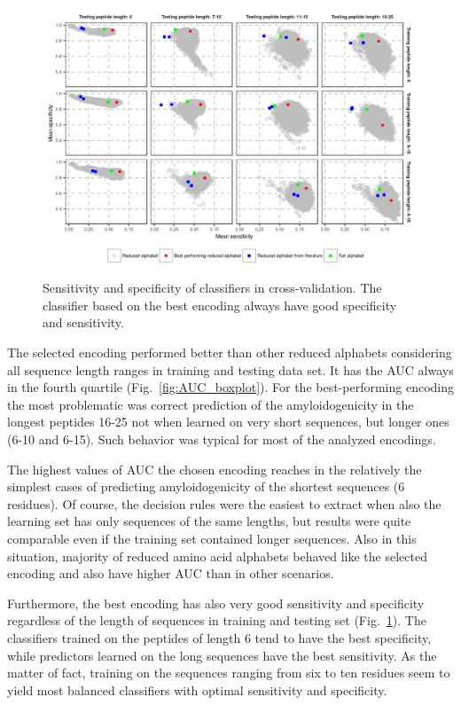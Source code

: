 \documentclass{bioinfo}
\begin{document}
\begin{figure}[!tpb]
\centerline{\includegraphics{figures/sesp_plot.png}}
\caption{Sensitivity and specificity of classifiers in cross-validation. 
The classifier based on the best encoding always have 
good specificity and sensitivity.}\label{fig:sesp_plot}
\end{figure}

  The selected encoding performed better than other reduced alphabets 
considering all sequence length ranges in training and testing data set. It has 
the AUC always in the fourth quartile (Fig.~\ref{fig:AUC_boxplot}). For the 
best-performing encoding the most problematic was correct prediction of the 
amyloidogenicity in the longest peptides 16-25 not when learned on very short 
sequences, but longer ones (6-10 and 6-15). Such behavior was typical for most 
of the analyzed encodings.

  The highest values of AUC the chosen encoding reaches in the relatively the 
simplest cases of predicting amyloidogenicity of the shortest sequences (6 
residues). Of course, the decision rules were the easiest to extract when also 
the learning set has only sequences of the same lengths, but results were quite 
comparable even if the training set contained longer sequences. Also in this 
situation, majority of reduced amino acid alphabets behaved like the selected 
encoding and also have higher AUC than in other scenarios.

  Furthermore, the best encoding has also very good sensitivity and specificity 
regardless of the length of sequences in training and testing 
set (Fig.~\ref{fig:sesp_plot}). The classifiers trained on the peptides of 
length 6 tend to have the best specificity, while predictors learned on the 
long sequences have the best sensitivity. As the matter of fact, training on 
the sequences ranging from six to ten residues seem to yield most balanced 
classifiers with optimal sensitivity and specificity.
\end{document}
